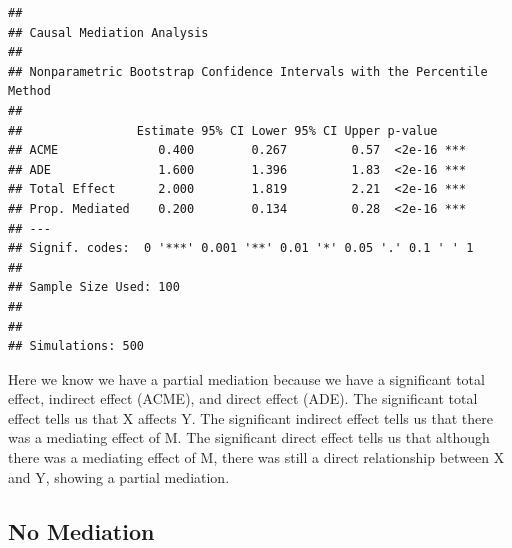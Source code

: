 \documentclass[]{book}
\begin{document}
\begin{verbatim}
## 
## Causal Mediation Analysis 
## 
## Nonparametric Bootstrap Confidence Intervals with the Percentile Method
## 
##                Estimate 95% CI Lower 95% CI Upper p-value    
## ACME              0.400        0.267         0.57  <2e-16 ***
## ADE               1.600        1.396         1.83  <2e-16 ***
## Total Effect      2.000        1.819         2.21  <2e-16 ***
## Prop. Mediated    0.200        0.134         0.28  <2e-16 ***
## ---
## Signif. codes:  0 '***' 0.001 '**' 0.01 '*' 0.05 '.' 0.1 ' ' 1
## 
## Sample Size Used: 100 
## 
## 
## Simulations: 500
\end{verbatim}

Here we know we have a partial mediation because we have a significant total effect, indirect effect (ACME), and direct effect (ADE). The significant total effect tells us that X affects Y. The significant indirect effect tells us that there was a mediating effect of M. The significant direct effect tells us that although there was a mediating effect of M, there was still a direct relationship between X and Y, showing a partial mediation.

\hypertarget{no-mediation}{%
\subsection{No Mediation}\label{no-mediation}}
\end{document}
